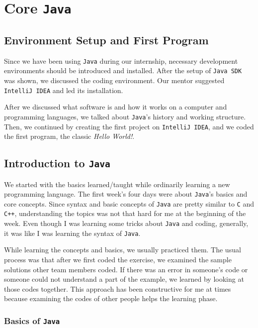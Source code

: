 \section{Core \texttt{Java}}

\subsection{Environment Setup and First Program}

Since we have been using \texttt{\texttt{Java}} during our internship, necessary development environments should be introduced and installed. After the setup of \texttt{\texttt{Java} SDK} was shown, we discussed the coding environment. Our mentor suggested \texttt{IntelliJ IDEA} and led its installation.

After we discussed what software is and how it works on a computer and programming languages, we talked about \texttt{\texttt{Java}}'s history and working structure. Then, we continued by creating the first project on \texttt{IntelliJ IDEA}, and we coded the first program, the classic \textit{Hello World!}.


\subsection{Introduction to \texttt{Java}}

We started with the basics learned/taught while ordinarily learning a new programming language. The first week's four days were about \texttt{\texttt{Java}}'s basics and core concepts. Since syntax and basic concepts of \texttt{\texttt{Java}} are pretty similar to \texttt{C} and \texttt{C++}, understanding the topics was not that hard for me at the beginning of the week. Even though I was learning some tricks about \texttt{\texttt{Java}} and coding, generally, it was like I was learning the syntax of \texttt{\texttt{Java}}.

While learning the concepts and basics, we usually practiced them. The usual process was that after we first coded the exercise, we examined the sample solutions other team members coded. If there was an error in someone's code or someone could not understand a part of the example, we learned by looking at those codes together. This approach has been constructive for me at times because examining the codes of other people helps the learning phase.

\subsubsection{Basics of \texttt{Java}}

